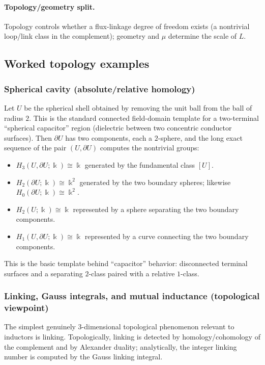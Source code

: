 \documentclass[11pt]{article}
\begin{document}
\paragraph{Topology/geometry split.}
Topology controls whether a flux-linkage degree of freedom exists (a nontrivial loop/link class in the complement); geometry and $\mu$ determine the scale of $L$.

\subsection{Worked topology examples}
\label{sec:worked-topology-examples}
\subsubsection{Spherical cavity (absolute/relative homology)}
Let $U$ be the spherical shell obtained by removing the unit ball from the ball of radius $2$.
This is the standard connected field-domain template for a two-terminal ``spherical capacitor'' region (dielectric between two concentric conductor surfaces).
Then $\partial U$ has two components, each a $2$-sphere, and the long exact sequence of the pair $(U,\partial U)$ computes the nontrivial groups:
\begin{itemize}
  \item $H_3(U,\partial U;\Bbbk)\cong \Bbbk$ generated by the fundamental class $[U]$.
  \item $H_2(\partial U;\Bbbk)\cong \Bbbk^2$ generated by the two boundary spheres; likewise $H_0(\partial U;\Bbbk)\cong \Bbbk^2$.
  \item $H_2(U;\Bbbk)\cong \Bbbk$ represented by a sphere separating the two boundary components.
  \item $H_1(U,\partial U;\Bbbk)\cong \Bbbk$ represented by a curve connecting the two boundary components.
\end{itemize}
This is the basic template behind ``capacitor'' behavior: disconnected terminal surfaces and a separating $2$-class paired with a relative $1$-class.

\subsubsection{Linking, Gauss integrals, and mutual inductance (topological viewpoint)}
\label{sec:linking-mutual}
The simplest genuinely $3$-dimensional topological phenomenon relevant to inductors is linking.
Topologically, linking is detected by homology/cohomology of the complement and by Alexander duality; analytically, the integer linking number is computed by the Gauss linking integral.
\end{document}
